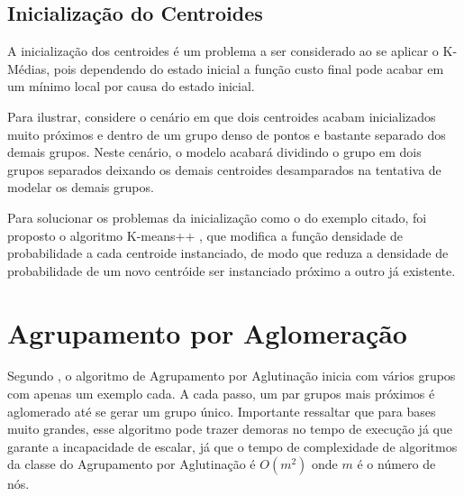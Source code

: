 \subsection{Inicialização do Centroides}

A inicialização dos centroides é um problema a ser considerado ao se aplicar o K-Médias, pois dependendo do estado inicial a função custo final pode acabar em um mínimo local por causa do estado inicial.

Para ilustrar, considere o cenário em que dois centroides acabam inicializados muito próximos e dentro de um grupo denso de pontos e bastante separado dos demais grupos. Neste cenário, o modelo acabará dividindo o grupo em dois grupos separados deixando os demais centroides desamparados na tentativa de modelar os demais grupos.

Para solucionar os problemas da inicialização como o do exemplo citado, foi proposto o algoritmo K-means++ \citep{arthur2007k}, que modifica a função densidade de probabilidade a cada centroide instanciado, de modo que reduza a densidade de probabilidade de um novo centróide ser instanciado próximo a outro já existente.

\section{Agrupamento por Aglomeração}

Segundo \citet{friedman2001elements}, o algoritmo de Agrupamento por Aglutinação inicia com vários grupos com apenas um exemplo cada. A cada passo, um par grupos mais próximos é aglomerado até se gerar um grupo único. Importante ressaltar que para bases muito grandes, esse algoritmo pode trazer demoras no tempo de execução já que \citet{rokach2005clustering} garante a incapacidade de escalar, já que o tempo de complexidade de algoritmos da classe do Agrupamento por Aglutinação é \(O(m^2)\) onde \(m\) é o número de nós.